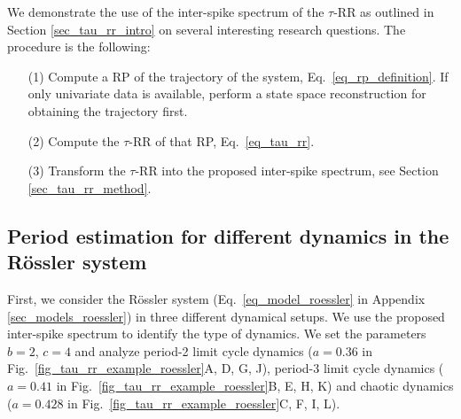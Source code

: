 \documentclass[entropy,article,submit,pdftex,moreauthors]{Definitions/mdpi}
\begin{document}
We demonstrate the use of the inter-spike spectrum of the $\tau$-RR as outlined in 
Section \ref{sec_tau_rr_intro} on several interesting research questions. The procedure is the following:
\begin{itemize}[noitemsep]
\item[(1)] Compute a RP of the trajectory of the system, Eq.~\eqref{eq_rp_definition}. If only univariate data is available, perform a state space reconstruction for obtaining the trajectory first.
\item[(2)] Compute the $\tau$-RR of that RP, Eq.~\eqref{eq_tau_rr}.
\item[(3)] Transform the $\tau$-RR into the proposed inter-spike spectrum, see Section \ref{sec_tau_rr_method}.
\end{itemize}


\subsection{Period estimation for different dynamics in the R\"ossler system}
First, we consider the R\"ossler system (Eq.~\eqref{eq_model_roessler} in Appendix \ref{sec_models_roessler}) 
in three different dynamical setups. We use the proposed inter-spike spectrum to
identify the type of dynamics.
We set the parameters $b=2$, $c=4$ and analyze period-2 limit cycle dynamics ($a=0.36$ in Fig.~\ref{fig_tau_rr_example_roessler}A, D, G, J), 
period-3 limit cycle dynamics ($a=0.41$ in Fig.~\ref{fig_tau_rr_example_roessler}B, E, H, K) and chaotic dynamics ($a=0.428$ in Fig.~\ref{fig_tau_rr_example_roessler}C, F, I, L).  
\end{document}
